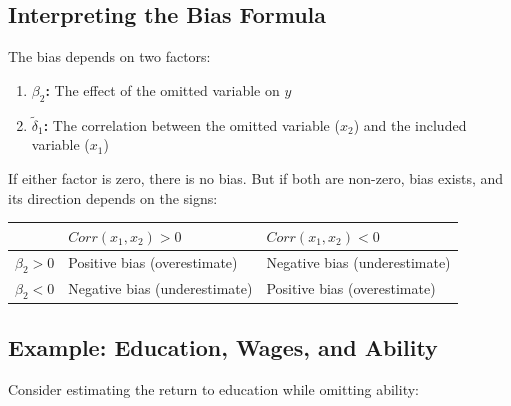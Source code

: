 \documentclass[
  letterpaper,
  DIV=11,
  numbers=noendperiod]{scrreprt}
\newcounter{none} %
\providecommand{\tightlist}{%
  \setlength{\itemsep}{0pt}\setlength{\parskip}{0pt}}
\begin{document}
\subsection{Interpreting the Bias
Formula}\label{interpreting-the-bias-formula}

The bias depends on two factors:

\begin{enumerate}
\def\labelenumi{\arabic{enumi}.}
\tightlist
\item
  \textbf{\(\beta_2\):} The effect of the omitted variable on \(y\)
\item
  \textbf{\(\tilde{\delta}_1\):} The correlation between the omitted
  variable (\(x_2\)) and the included variable (\(x_1\))
\end{enumerate}

If either factor is zero, there is no bias. But if both are non-zero,
bias exists, and its direction depends on the signs:

{\def\LTcaptype{none} %
\begin{longtable}[]{@{}
  >{\raggedright\arraybackslash}p{}
  >{\raggedright\arraybackslash}p{}
  >{\raggedright\arraybackslash}p{}@{}}
\toprule\noalign{}
\begin{minipage}[b]{\linewidth}\raggedright
\end{minipage} & \begin{minipage}[b]{\linewidth}\raggedright
\(Corr(x_1, x_2) > 0\)
\end{minipage} & \begin{minipage}[b]{\linewidth}\raggedright
\(Corr(x_1, x_2) < 0\)
\end{minipage} \\
\midrule\noalign{}
\endhead
\bottomrule\noalign{}
\endlastfoot
\(\beta_2 > 0\) & Positive bias (overestimate) & Negative bias
(underestimate) \\
\(\beta_2 < 0\) & Negative bias (underestimate) & Positive bias
(overestimate) \\
\end{longtable}
}

\subsection{Example: Education, Wages, and
Ability}\label{example-education-wages-and-ability}

Consider estimating the return to education while omitting ability:
\end{document}
